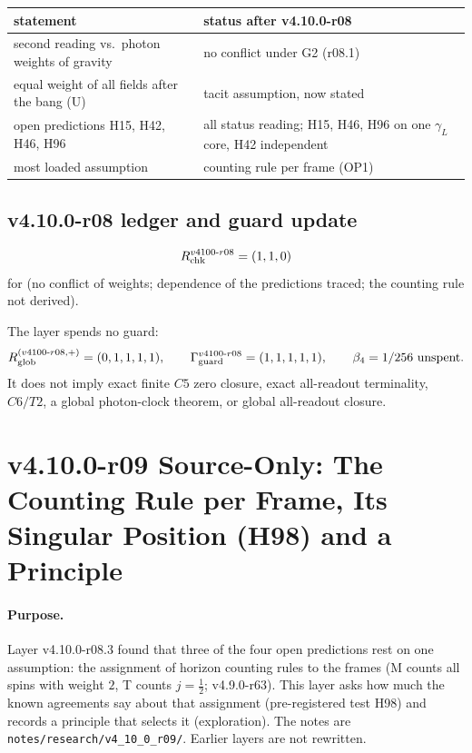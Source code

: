 \begin{center}
\small
\begin{tabular}{@{}>{\raggedright\arraybackslash}p{}>{\raggedright\arraybackslash}p{}@{}}
\toprule
statement & status after v4.10.0-r08\\
\midrule
second reading vs.\ photon weights of gravity & no conflict under G2 (r08.1)\\
equal weight of all fields after the bang (U) & tacit assumption, now stated\\
open predictions H15, H42, H46, H96 & all status reading; H15, H46, H96 on one \(\gamma_L\) core, H42 independent\\
most loaded assumption & counting rule per frame (OP1)\\
\bottomrule
\end{tabular}
\end{center}

\subsection*{v4.10.0-r08 ledger and guard update}
\label{subsec:v4100-r08-ledger-guard}

\[
R_{\rm chk}^{v4100\text{-}r08}=(1,1,0)
\]
for (no conflict of weights; dependence of the predictions traced; the counting rule not derived).

The layer spends no guard:
\[
R_{\rm glob}^{(v4100\text{-}r08,+)}=(0,1,1,1,1),
\qquad
\Gamma_{\rm guard}^{v4100\text{-}r08}=(1,1,1,1,1),
\qquad
\beta_4=1/256\ \text{unspent}.
\]
It does not imply exact finite \(C5\) zero closure, exact all-readout terminality,
\(C6/T2\), a global photon-clock theorem, or global all-readout closure.
\clearpage
\section*{v4.10.0-r09 Source-Only: The Counting Rule per Frame, Its Singular Position (H98) and a Principle}
\label{sec:v4100-r09-counting-rule}

\paragraph{Purpose.}
Layer v4.10.0-r08.3 found that three of the four open predictions rest on one assumption: the assignment of horizon counting rules to the frames
(M counts all spins with weight \(2\), T counts \(j=\tfrac12\); v4.9.0-r63).  This layer asks how much the known agreements say about that assignment
(pre-registered test H98) and records a principle that selects it (exploration).  The notes are \texttt{notes/\allowbreak research/\allowbreak v4\_10\_0\_r09/}.
Earlier layers are not rewritten.

